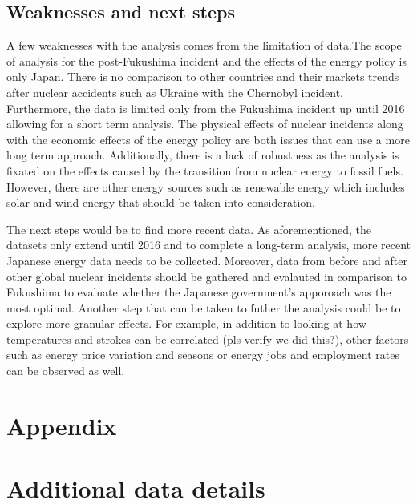 \documentclass[
]{article}
\begin{document}
\hypertarget{weaknesses-and-next-steps}{%
\subsection{Weaknesses and next steps}\label{weaknesses-and-next-steps}}

A few weaknesses with the analysis comes from the limitation of data.The
scope of analysis for the post-Fukushima incident and the effects of the
energy policy is only Japan. There is no comparison to other countries
and their markets trends after nuclear accidents such as Ukraine with
the Chernobyl incident. Furthermore, the data is limited only from the
Fukushima incident up until 2016 allowing for a short term analysis. The
physical effects of nuclear incidents along with the economic effects of
the energy policy are both issues that can use a more long term
approach. Additionally, there is a lack of robustness as the analysis is
fixated on the effects caused by the transition from nuclear energy to
fossil fuels. However, there are other energy sources such as renewable
energy which includes solar and wind energy that should be taken into
consideration.

The next steps would be to find more recent data. As aforementioned, the
datasets only extend until 2016 and to complete a long-term analysis,
more recent Japanese energy data needs to be collected. Moreover, data
from before and after other global nuclear incidents should be gathered
and evalauted in comparison to Fukushima to evaluate whether the
Japanese government's apporoach was the most optimal. Another step that
can be taken to futher the analysis could be to explore more granular
effects. For example, in addition to looking at how temperatures and
strokes can be correlated (pls verify we did this?), other factors such
as energy price variation and seasons or energy jobs and employment
rates can be observed as well.

\newpage

\appendix

\hypertarget{appendix}{%
\section*{Appendix}\label{appendix}}

\hypertarget{additional-data-details}{%
\section{Additional data details}\label{additional-data-details}}
\end{document}
